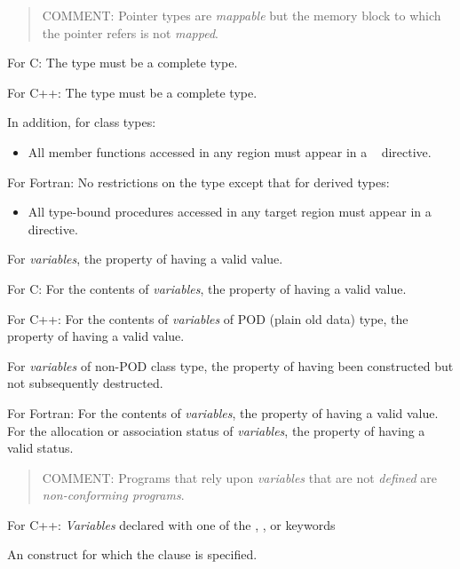 \begin{quote}
COMMENT: Pointer types are \emph{mappable} but the memory block to which the pointer refers is not \emph{mapped}.
\end{quote}

For C: 
\nopagebreak
The type must be a complete type.

For C++: 
\nopagebreak
The type must be a complete type.

In addition, for class types:
\begin{itemize}
\item All member functions accessed in any  region must appear in a 
~ directive.
\end{itemize}

For Fortran: 
\nopagebreak
No restrictions on the type except that for derived types:

\begin{itemize}
\item All type-bound procedures accessed in any target region must appear in a ~ directive.
\end{itemize}
\glossarydefend

\glossarydefstart
For \emph{variables}, the property of having a valid value.

For C:
\nopagebreak
For the contents of \emph{variables}, the property of having a valid value.

For C++: 
\nopagebreak
For the contents of \emph{variables} of POD (plain old data) type, the property of having 
a valid value.

For \emph{variables} of non-POD class type, the property of having been constructed but 
not subsequently destructed.

For Fortran: 
\nopagebreak
For the contents of \emph{variables}, the property of having a valid value. For the 
allocation or association status of \emph{variables}, the property of having a valid status.

\begin{quote}
COMMENT: Programs that rely upon \emph{variables} that are not \emph{defined} are \emph{non-conforming programs}.
\end{quote}
\glossarydefend

\glossarydefstart
For C++: \emph{Variables} declared with one of the , , or  keywords
\glossarydefend

\glossarydefstart
An  construct for which the  clause is specified.
\glossarydefend
\bigskip

